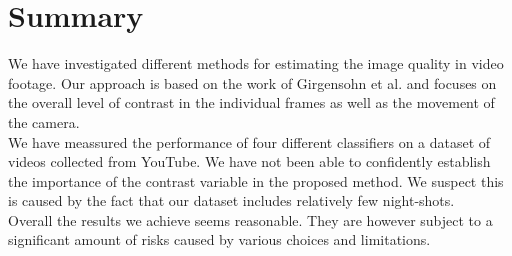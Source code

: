 \section{Summary}
%
We have investigated different methods for estimating the image quality in video footage. Our approach is based on the work of Girgensohn et al.\cite{Girgensohn:2000:SAH:354401.354415} and focuses on the overall level of contrast in the individual frames as well as the movement of the camera.\\
We have meassured the performance of four different classifiers on a dataset of videos collected from YouTube. We have not been able to confidently establish the importance of the contrast variable in the proposed method. We suspect this is caused by the fact that our dataset includes relatively few night-shots.\\
Overall the results we achieve seems reasonable. They are however subject to a significant amount of risks caused by various choices and limitations.